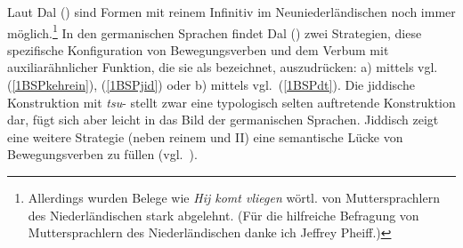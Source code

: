   Laut Dal (\citeyear{Dal1954}) sind Formen mit reinem Infinitiv im \mbox{Neuniederländischen} noch immer möglich.\footnote{Allerdings wurden Belege wie {\ndl} \textit{Hij komt vliegen} wörtl.  von Muttersprachlern des Niederländischen stark abgelehnt. (Für die hilfreiche Befragung von Muttersprachlern des Niederländischen danke ich Jeffrey Pheiff.)} In den germanischen Sprachen findet Dal (\citeyear[495]{Dal1954}) zwei Strategien, diese spezifische Konfiguration von Bewegungsverben und dem Verbum  mit auxiliarähnlicher Funktion, die sie als  bezeichnet, auszudrücken: a) mittels  vgl.\, (\ref{1BSPkehrein}), (\ref{1BSPjid}) oder b) mittels  vgl.\, (\ref{1BSPdt}). Die jiddische Konstruktion mit \textit{tsu}- stellt zwar eine typologisch selten auftretende Konstruktion dar, fügt sich aber leicht in das Bild der germanischen Sprachen. Jiddisch zeigt eine weitere  Strategie (neben reinem  und  II) eine semantische Lücke von Bewegungsverben zu füllen (vgl.\, \citealt{Riemsdijk2002}). 
  

